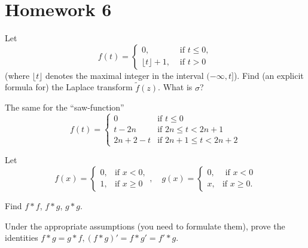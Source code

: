 
\section*{Homework 6}\renewcommand{\leftmark}{Homework 6}

\begin{exercise}
Let
\begin{equation}
f(t)=\begin{cases}
0, &\mbox{ if }t\leq0,\\
\lfloor t\rfloor+1, &\mbox{ if }t>0
\end{cases}
\end{equation}
(where $\lfloor{t}\rfloor$ denotes the maximal integer in the interval $(-\infty, t]$). Find (an explicit formula for) the Laplace transform $\widetilde{f}(z)$. What is $\sigma$?
\end{exercise}
\begin{exercise}
The same for the ``saw-function''
\begin{equation}
f(t)=\begin{cases}
0 & \mbox{if }t\leq0\\
t-2n & \mbox{if }2n\leq t<2n+1\\
2n+2-t & \mbox{if }2n+1\leq t<2n+2
\end{cases}
\end{equation}
\end{exercise}
\begin{exercise}
Let
\begin{equation}
f(x)=\begin{cases}0,&\mbox{if }x<0,\\
1,&\mbox{if }x\geq0
\end{cases},\quad
g(x)=\begin{cases} 0, &\mbox{ if }x<0\\
x,&\mbox{if }x\geq0.
\end{cases}
\end{equation}


Find $f*f$, $f*g$, $g*g$.
\end{exercise}
\begin{exercise}
Under the appropriate assumptions (you need to formulate them),
prove the identities $f*g=g*f, (f*g)'=f*g'=f'*g$. 
\end{exercise}
